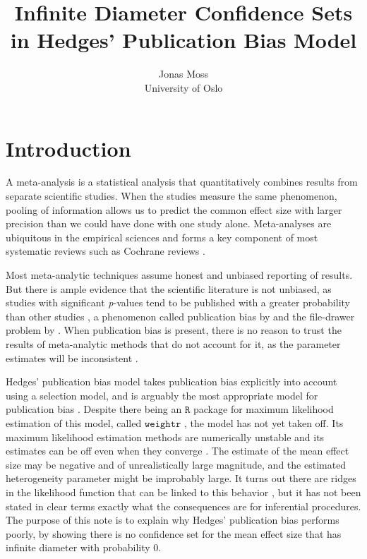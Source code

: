 \documentclass[article]{ajs}
\author{Jonas Moss \\ University of Oslo}
\title{Infinite Diameter Confidence Sets in Hedges' Publication Bias Model}
\numberwithin{equation}{section}
\numberwithin{figure}{section}
\theoremstyle{plain}
\theoremstyle{definition}
\theoremstyle{definition}
\theoremstyle{plain}
\begin{document}
\section{Introduction}

A meta-analysis is a statistical analysis that quantitatively combines
results from separate scientific studies. When the studies measure
the same phenomenon, pooling of information allows us to predict the
common effect size with larger precision than we could have done with
one study alone. Meta-analyses are ubiquitous in the empirical sciences
and forms a key component of most systematic reviews such as Cochrane
reviews \citep{Higgins2019-vv}.

Most meta-analytic techniques assume honest and unbiased reporting
of results. But there is ample evidence that the scientific literature
is not unbiased, as studies with\emph{ }significant \textit{p}-values
tend to be published with a greater probability than other studies
\citep{Easterbrook1991-ph}, a phenomenon called publication bias
by \citet{sterling1959publication} and the file-drawer problem by
\citet{Rosenthal1979-pm}. When publication bias is present, there
is no reason to trust the results of meta-analytic methods that do
not account for it, as the parameter estimates will be inconsistent
\citep{Carter2019-rw}. 

Hedges' \citeyearpar{hedges1992modeling} publication bias model takes publication bias explicitly into account using a selection model, and is arguably the most appropriate model for publication bias \citep{Carter2019-rw}. Despite there being an $\mathtt{R}$ \citep{Team2013-tt} package for maximum likelihood estimation of this model, called $\texttt{weightr}$ \citep{Coburn2019-ec}, the model has not yet taken off. Its maximum likelihood estimation methods are numerically unstable and its estimates can be off even when they converge \citep{Coburn2019-ec,Stanley2005-ng}. The estimate of the mean effect size may be negative and of unrealistically large magnitude, and the estimated heterogeneity parameter might be improbably large. It turns out there are ridges in the likelihood function that can be linked to this behavior \citep{McShane2016-rb}, but it has not been stated in clear terms exactly what the consequences are for inferential procedures. The purpose of this note is to explain why Hedges' publication bias performs poorly, by showing there is no confidence set for the mean effect size that has infinite diameter with probability $0$. %
\end{document}
